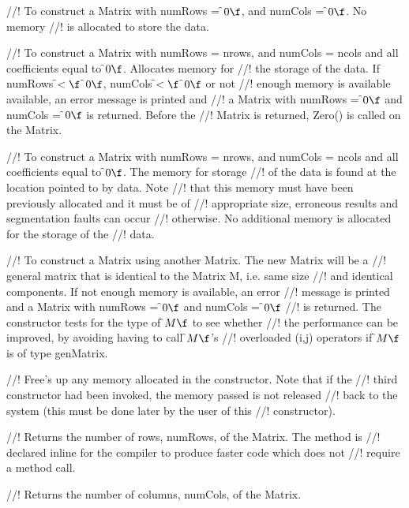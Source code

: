 //! To construct a Matrix with numRows = \f$0\f$, and numCols = \f$0\f$. No memory
//! is allocated to store the data. 

//! To construct a Matrix with numRows = \p nrows, and numCols =
\p ncols and all coefficients equal to \f$0\f$. Allocates memory for
//! the storage of the data. If numRows \f$<\f$ \f$0\f$, numCols \f$<\f$ \f$0\f$ or not
//! enough memory is available available, an error message is printed and
//! a Matrix with numRows = \f$0\f$ and numCols = \f$0\f$ is returned. Before the
//! Matrix is returned, Zero() is called on the Matrix. 

//! To construct a Matrix with numRows = \p nrows, and numCols =
\p ncols and all coefficients equal to \f$0\f$. The memory for storage
//! of the data is found at the location pointed to by \p data. Note
//! that this memory must have been previously allocated and it must be of
//! appropriate size, erroneous results and segmentation faults can occur
//! otherwise. No additional memory is allocated for the storage of the
//! data. 

//! To construct a Matrix using another Matrix. The new Matrix will be a
//! general matrix that is identical to the Matrix \p M, i.e. same size
//! and identical components. If not enough memory is available, an error
//! message is printed and a Matrix with numRows = \f$0\f$ and numCols = \f$0\f$
//! is returned. The constructor tests for the type of \f$M\f$ to see whether
//! the performance can be improved, by avoiding having to call \f$M\f$'s
//! overloaded (i,j) operators if \f$M\f$ is of type genMatrix. 

//! Free's up any memory allocated in the constructor. Note that if the
//! third constructor had been invoked, the memory passed is not released
//! back to the system (this must be done later by the user of this
//! constructor).

//! Returns the number of rows, numRows, of the Matrix. The method is
//! declared inline for the compiler to produce faster code which does not
//! require a method call.

//! Returns the number of columns, numCols, of the Matrix.

